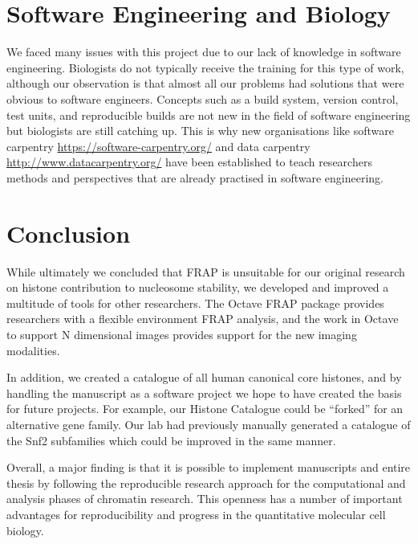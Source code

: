 \section{Software Engineering and Biology}

We faced many issues with this project due to our lack of knowledge in
software engineering.  Biologists do not typically receive the training for this
type of work, although our observation is that almost all our
problems had solutions that were obvious to software engineers.
Concepts such as a build system, version control, test units,
and reproducible builds are not new in the field of software engineering but
biologists are still catching up.  This is why new
organisations like software
carpentry \url{https://software-carpentry.org/} and data
carpentry \url{http://www.datacarpentry.org/} have been established to
teach researchers
methods and perspectives that are already practised in software engineering.

\section{Conclusion}

While ultimately we concluded that FRAP
is unsuitable for our original research on histone contribution to
nucleosome stability,
we developed
and improved a multitude of tools for other researchers.  The Octave
FRAP package provides researchers with a flexible environment FRAP
analysis, and the work in Octave to support N dimensional images
provides support for the new imaging modalities.

In addition, we created a catalogue of all human canonical core
histones, and by handling the manuscript as a software project we hope
to have created the basis for future projects.  For example, our
Histone Catalogue could be ``forked'' for an alternative gene family.
Our lab had previously manually generated a catalogue of the Snf2
subfamilies \citep{andrew-snf2-catalogue} which could be improved in
the same manner.

Overall, a major finding is that it is possible to implement
manuscripts and entire thesis by following the reproducible research
approach for the computational and analysis phases of chromatin
research.  This openness has a number of important advantages for
reproducibility and progress in the quantitative molecular cell biology.

